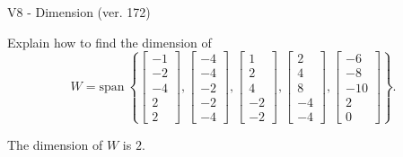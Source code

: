 \begin{exercise}
  \begin{exerciseTitle}V8 - Dimension (ver. 172)\end{exerciseTitle}
  \begin{exerciseStatement}
    Explain how to find the dimension of 
\[W=\mathrm{span}\ \left\{\left[\begin{array}{r}
-1 \\
-2 \\
-4 \\
2 \\
2
\end{array}\right] , \left[\begin{array}{r}
-4 \\
-4 \\
-2 \\
-2 \\
-4
\end{array}\right] , \left[\begin{array}{r}
1 \\
2 \\
4 \\
-2 \\
-2
\end{array}\right] , \left[\begin{array}{r}
2 \\
4 \\
8 \\
-4 \\
-4
\end{array}\right] , \left[\begin{array}{r}
-6 \\
-8 \\
-10 \\
2 \\
0
\end{array}\right]\right\}.\]



  \end{exerciseStatement}
  \begin{exerciseAnswer}
   The dimension of \(W\) is  \(2\).
  


  \end{exerciseAnswer}
\end{exercise}